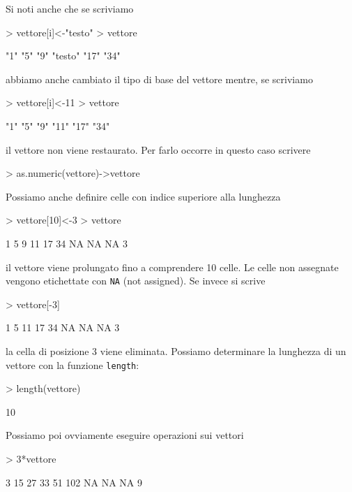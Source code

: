 \documentclass[onecolumn,11pt]{book}
\begin{document}
Si noti anche che se scriviamo
\begin{Schunk}
\begin{Sinput}
> vettore[i]<-"testo"
> vettore
\end{Sinput}
\begin{Soutput}
[1] "1"     "5"     "9"     "testo" "17"    "34"   
\end{Soutput}
\end{Schunk}
abbiamo anche cambiato il tipo di base del vettore mentre, se scriviamo
\begin{Schunk}
\begin{Sinput}
> vettore[i]<-11
> vettore
\end{Sinput}
\begin{Soutput}
[1] "1"  "5"  "9"  "11" "17" "34"
\end{Soutput}
\end{Schunk}
il vettore non viene restaurato. Per farlo occorre in questo caso scrivere
\begin{Schunk}
\begin{Sinput}
> as.numeric(vettore)->vettore
\end{Sinput}
\end{Schunk}
Possiamo anche definire celle con indice superiore alla lunghezza
\begin{Schunk}
\begin{Sinput}
> vettore[10]<-3
> vettore
\end{Sinput}
\begin{Soutput}
 [1]  1  5  9 11 17 34 NA NA NA  3
\end{Soutput}
\end{Schunk}
 il vettore viene prolungato fino a comprendere 10 celle. Le celle non assegnate vengono etichettate con \texttt{NA} (not assigned).
 Se invece si scrive
\begin{Schunk}
\begin{Sinput}
> vettore[-3]
\end{Sinput}
\begin{Soutput}
[1]  1  5 11 17 34 NA NA NA  3
\end{Soutput}
\end{Schunk}
la cella di posizione 3 viene eliminata.
Possiamo determinare la lunghezza di un vettore con la funzione \texttt{length}:
\begin{Schunk}
\begin{Sinput}
> length(vettore)
\end{Sinput}
\begin{Soutput}
[1] 10
\end{Soutput}
\end{Schunk}
 Possiamo poi ovviamente eseguire operazioni sui vettori
\begin{Schunk}
\begin{Sinput}
> 3*vettore
\end{Sinput}
\begin{Soutput}
 [1]   3  15  27  33  51 102  NA  NA  NA   9
\end{Soutput}
\end{Schunk}
\end{document}
